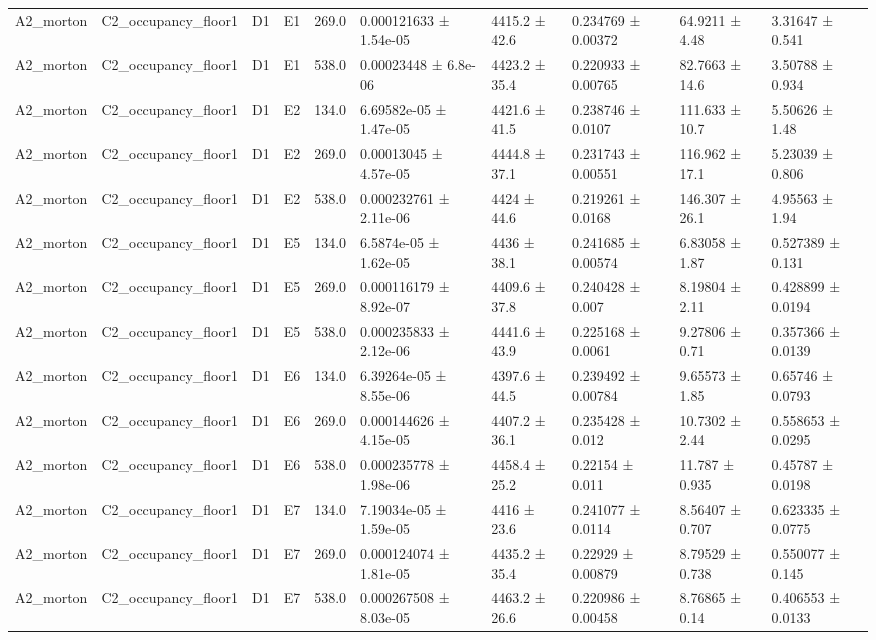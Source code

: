 \begin{table}
\begin{tabular}{llllllllll}
A2\_morton & C2\_occupancy\_floor1 & D1 & E1 & 269.0 & 0.000121633 ± 1.54e-05 & 4415.2 ± 42.6 & 0.234769 ± 0.00372 & 64.9211 ± 4.48 & 3.31647 ± 0.541 \\
A2\_morton & C2\_occupancy\_floor1 & D1 & E1 & 538.0 & 0.00023448 ± 6.8e-06 & 4423.2 ± 35.4 & 0.220933 ± 0.00765 & 82.7663 ± 14.6 & 3.50788 ± 0.934 \\
A2\_morton & C2\_occupancy\_floor1 & D1 & E2 & 134.0 & 6.69582e-05 ± 1.47e-05 & 4421.6 ± 41.5 & 0.238746 ± 0.0107 & 111.633 ± 10.7 & 5.50626 ± 1.48 \\
A2\_morton & C2\_occupancy\_floor1 & D1 & E2 & 269.0 & 0.00013045 ± 4.57e-05 & 4444.8 ± 37.1 & 0.231743 ± 0.00551 & 116.962 ± 17.1 & 5.23039 ± 0.806 \\
A2\_morton & C2\_occupancy\_floor1 & D1 & E2 & 538.0 & 0.000232761 ± 2.11e-06 & 4424 ± 44.6 & 0.219261 ± 0.0168 & 146.307 ± 26.1 & 4.95563 ± 1.94 \\
A2\_morton & C2\_occupancy\_floor1 & D1 & E5 & 134.0 & 6.5874e-05 ± 1.62e-05 & 4436 ± 38.1 & 0.241685 ± 0.00574 & 6.83058 ± 1.87 & 0.527389 ± 0.131 \\
A2\_morton & C2\_occupancy\_floor1 & D1 & E5 & 269.0 & 0.000116179 ± 8.92e-07 & 4409.6 ± 37.8 & 0.240428 ± 0.007 & 8.19804 ± 2.11 & 0.428899 ± 0.0194 \\
A2\_morton & C2\_occupancy\_floor1 & D1 & E5 & 538.0 & 0.000235833 ± 2.12e-06 & 4441.6 ± 43.9 & 0.225168 ± 0.0061 & 9.27806 ± 0.71 & 0.357366 ± 0.0139 \\
A2\_morton & C2\_occupancy\_floor1 & D1 & E6 & 134.0 & 6.39264e-05 ± 8.55e-06 & 4397.6 ± 44.5 & 0.239492 ± 0.00784 & 9.65573 ± 1.85 & 0.65746 ± 0.0793 \\
A2\_morton & C2\_occupancy\_floor1 & D1 & E6 & 269.0 & 0.000144626 ± 4.15e-05 & 4407.2 ± 36.1 & 0.235428 ± 0.012 & 10.7302 ± 2.44 & 0.558653 ± 0.0295 \\
A2\_morton & C2\_occupancy\_floor1 & D1 & E6 & 538.0 & 0.000235778 ± 1.98e-06 & 4458.4 ± 25.2 & 0.22154 ± 0.011 & 11.787 ± 0.935 & 0.45787 ± 0.0198 \\
A2\_morton & C2\_occupancy\_floor1 & D1 & E7 & 134.0 & 7.19034e-05 ± 1.59e-05 & 4416 ± 23.6 & 0.241077 ± 0.0114 & 8.56407 ± 0.707 & 0.623335 ± 0.0775 \\
A2\_morton & C2\_occupancy\_floor1 & D1 & E7 & 269.0 & 0.000124074 ± 1.81e-05 & 4435.2 ± 35.4 & 0.22929 ± 0.00879 & 8.79529 ± 0.738 & 0.550077 ± 0.145 \\
A2\_morton & C2\_occupancy\_floor1 & D1 & E7 & 538.0 & 0.000267508 ± 8.03e-05 & 4463.2 ± 26.6 & 0.220986 ± 0.00458 & 8.76865 ± 0.14 & 0.406553 ± 0.0133 \\

\end{tabular}
\end{table}
